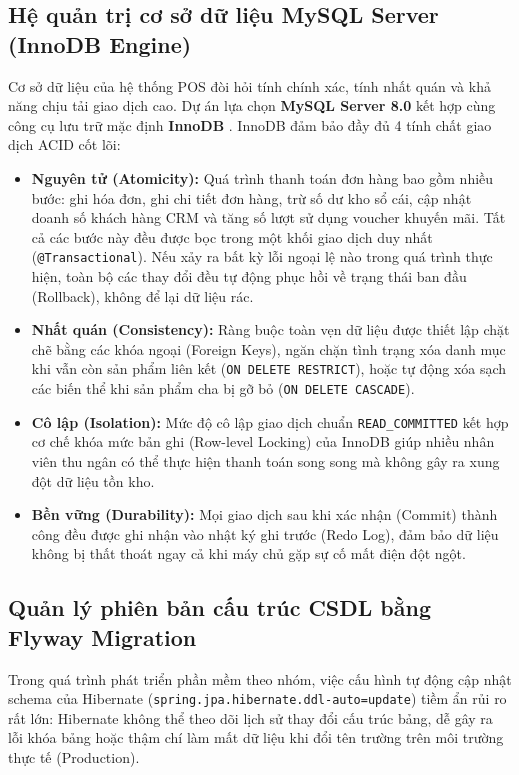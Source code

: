 \subsection{Hệ quản trị cơ sở dữ liệu MySQL Server (InnoDB Engine)}
Cơ sở dữ liệu của hệ thống POS đòi hỏi tính chính xác, tính nhất quán và khả năng chịu tải giao dịch cao. Dự án lựa chọn \textbf{MySQL Server 8.0} kết hợp cùng công cụ lưu trữ mặc định \textbf{InnoDB} \cite{mysqldoc2024}. InnoDB đảm bảo đầy đủ 4 tính chất giao dịch ACID cốt lõi:
\begin{itemize}[leftmargin=1.5cm]
    \item \textbf{Nguyên tử (Atomicity):} Quá trình thanh toán đơn hàng bao gồm nhiều bước: ghi hóa đơn, ghi chi tiết đơn hàng, trừ số dư kho sổ cái, cập nhật doanh số khách hàng CRM và tăng số lượt sử dụng voucher khuyến mãi. Tất cả các bước này đều được bọc trong một khối giao dịch duy nhất (\texttt{@Transactional}). Nếu xảy ra bất kỳ lỗi ngoại lệ nào trong quá trình thực hiện, toàn bộ các thay đổi đều tự động phục hồi về trạng thái ban đầu (Rollback), không để lại dữ liệu rác.
    \item \textbf{Nhất quán (Consistency):} Ràng buộc toàn vẹn dữ liệu được thiết lập chặt chẽ bằng các khóa ngoại (Foreign Keys), ngăn chặn tình trạng xóa danh mục khi vẫn còn sản phẩm liên kết (\texttt{ON DELETE RESTRICT}), hoặc tự động xóa sạch các biến thể khi sản phẩm cha bị gỡ bỏ (\texttt{ON DELETE CASCADE}).
    \item \textbf{Cô lập (Isolation):} Mức độ cô lập giao dịch chuẩn \texttt{READ\_COMMITTED} kết hợp cơ chế khóa mức bản ghi (Row-level Locking) của InnoDB giúp nhiều nhân viên thu ngân có thể thực hiện thanh toán song song mà không gây ra xung đột dữ liệu tồn kho.
    \item \textbf{Bền vững (Durability):} Mọi giao dịch sau khi xác nhận (Commit) thành công đều được ghi nhận vào nhật ký ghi trước (Redo Log), đảm bảo dữ liệu không bị thất thoát ngay cả khi máy chủ gặp sự cố mất điện đột ngột.
\end{itemize}

\subsection{Quản lý phiên bản cấu trúc CSDL bằng Flyway Migration}
Trong quá trình phát triển phần mềm theo nhóm, việc cấu hình tự động cập nhật schema của Hibernate (\texttt{spring.jpa.hibernate.ddl-auto=update}) tiềm ẩn rủi ro rất lớn: Hibernate không thể theo dõi lịch sử thay đổi cấu trúc bảng, dễ gây ra lỗi khóa bảng hoặc thậm chí làm mất dữ liệu khi đổi tên trường trên môi trường thực tế (Production).


